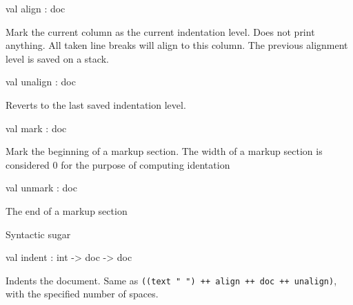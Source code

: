 \documentclass[11pt]{article}
\begin{document}
\label{val:Pretty.align}\begin{ocamldoccode}
val align : doc
\end{ocamldoccode}
\begin{ocamldocdescription}
Mark the current column as the current indentation level. Does not print
    anything. All taken line breaks will align to this column. The previous
    alignment level is saved on a stack.


\end{ocamldocdescription}




\label{val:Pretty.unalign}\begin{ocamldoccode}
val unalign : doc
\end{ocamldoccode}
\begin{ocamldocdescription}
Reverts to the last saved indentation level.


\end{ocamldocdescription}




\label{val:Pretty.mark}\begin{ocamldoccode}
val mark : doc
\end{ocamldoccode}
\begin{ocamldocdescription}
Mark the beginning of a markup section. The width of a markup section is 
 considered 0 for the purpose of computing identation


\end{ocamldocdescription}




\label{val:Pretty.unmark}\begin{ocamldoccode}
val unmark : doc
\end{ocamldoccode}
\begin{ocamldocdescription}
The end of a markup section


\end{ocamldocdescription}




Syntactic sugar



\label{val:Pretty.indent}\begin{ocamldoccode}
val indent : int -> doc -> doc
\end{ocamldoccode}
\begin{ocamldocdescription}
Indents the document. Same as {\tt{((text "  ") ++ align ++ doc ++ unalign)}},
    with the specified number of spaces.


\end{ocamldocdescription}
\end{document}
